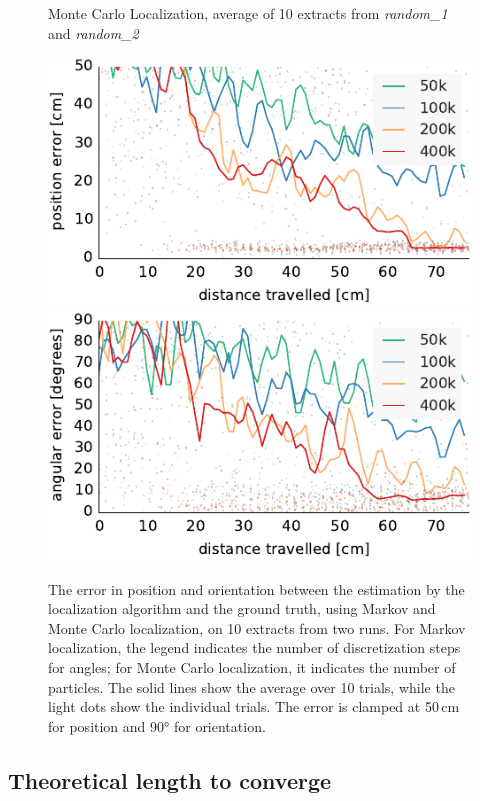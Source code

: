 \documentclass[letterpaper, 10pt, conference]{ieeeconf}
\begin{document}
\begin{figure}
\begin{center}
Monte Carlo Localization, average of 10 extracts from \emph{random\_1} and \emph{random\_2}
\end{center}
\includegraphics{mcl-small_runs_random_12-xy}\hfill
\includegraphics{mcl-small_runs_random_12-theta}

\caption{
The error in position and orientation between the estimation by the localization algorithm and the ground truth, using Markov and Monte Carlo localization, on 10 extracts from two runs.
For Markov localization, the legend indicates the number of discretization steps for angles; for Monte Carlo localization, it indicates the number of particles.
The solid lines show the average over 10 trials, while the light dots show the individual trials.
The error is clamped at 50\,cm for position and 90° for orientation.}
\label{fig:small-runs}
\end{figure}

\subsection{Theoretical length to converge}
\end{document}
